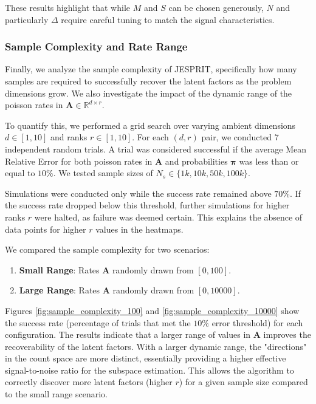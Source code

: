 These results highlight that while $M$ and $S$ can be chosen generously, $N$ and particularly $\Delta$ require careful tuning to match the signal characteristics.

\subsubsection{Sample Complexity and Rate Range}
Finally, we analyze the sample complexity of JESPRIT, specifically how many samples are required to successfully recover the latent factors as the problem dimensions grow. We also investigate the impact of the dynamic range of the poisson rates in $\mathbf{A} \in \mathbb{R}^{d \times r}$.

To quantify this, we performed a grid search over varying ambient dimensions $d \in [1, 10]$ and ranks $r \in [1, 10]$. For each $(d, r)$ pair, we conducted 7 independent random trials. A trial was considered successful if the average Mean Relative Error for both poisson rates in $\mathbf{A}$ and probabilities $\boldsymbol{\pi}$ was less than or equal to $10\%$. We tested sample sizes of $N_s \in \{1k, 10k, 50k, 100k\}$.

Simulations were conducted only while the success rate remained above $70\%$. If the success rate dropped below this threshold, further simulations for higher ranks $r$ were halted, as failure was deemed certain. This explains the absence of data points for higher $r$ values in the heatmaps.

We compared the sample complexity for two scenarios:
\begin{enumerate}
    \item \textbf{Small Range}: Rates $\mathbf{A}$ randomly drawn from $[0, 100]$.
    \item \textbf{Large Range}: Rates $\mathbf{A}$ randomly drawn from $[0, 10000]$.
\end{enumerate}

Figures \ref{fig:sample_complexity_100} and \ref{fig:sample_complexity_10000} show the success rate (percentage of trials that met the $10\%$ error threshold) for each configuration. The results indicate that a larger range of values in $\mathbf{A}$ improves the recoverability of the latent factors. With a larger dynamic range, the "directions" in the count space are more distinct, essentially providing a higher effective signal-to-noise ratio for the subspace estimation. This allows the algorithm to correctly discover more latent factors (higher $r$) for a given sample size compared to the small range scenario.

